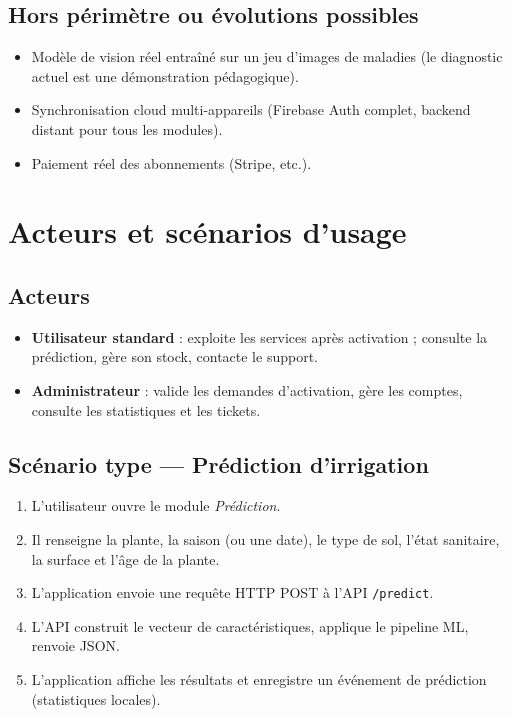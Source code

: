\documentclass[12pt,a4paper,twoside,openright]{report}
\begin{document}
\subsection{Hors périmètre ou évolutions possibles}
\begin{itemize}
  \item Modèle de vision réel entraîné sur un jeu d'images de maladies (le diagnostic actuel est une démonstration pédagogique).
  \item Synchronisation cloud multi-appareils (Firebase Auth complet, backend distant pour tous les modules).
  \item Paiement réel des abonnements (Stripe, etc.).
\end{itemize}

\section{Acteurs et scénarios d'usage}

\subsection{Acteurs}
\begin{itemize}
  \item \textbf{Utilisateur standard} : exploite les services après activation ; consulte la prédiction, gère son stock, contacte le support.
  \item \textbf{Administrateur} : valide les demandes d'activation, gère les comptes, consulte les statistiques et les tickets.
\end{itemize}

\subsection{Scénario type — Prédiction d'irrigation}
\begin{enumerate}
  \item L'utilisateur ouvre le module \textit{Prédiction}.
  \item Il renseigne la plante, la saison (ou une date), le type de sol, l'état sanitaire, la surface et l'âge de la plante.
  \item L'application envoie une requête HTTP POST à l'API \texttt{/predict}.
  \item L'API construit le vecteur de caractéristiques, applique le pipeline ML, renvoie JSON.
  \item L'application affiche les résultats et enregistre un événement de prédiction (statistiques locales).
\end{enumerate}
\end{document}
